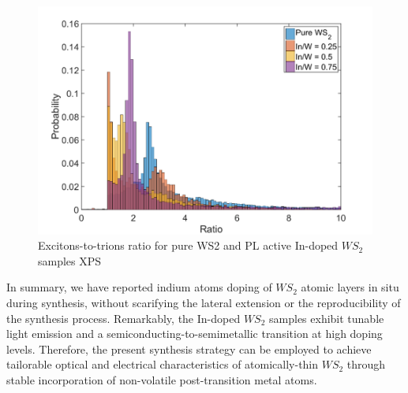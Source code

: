 \begin{figure}[!h]
	\begin{center}
		\includegraphics[scale=0.5]{In/PLRatioHistogram.png}
		\caption{Excitons-to-trions ratio for pure WS2 and PL active In-doped $WS_2$ samples XPS}
		\label{fig:InPLRatioHistogram}
	\end{center}
\end{figure}

In summary, we have reported indium atoms doping of $WS_2$ atomic layers in situ during synthesis, without scarifying the lateral extension or the reproducibility of the synthesis process. Remarkably, the In-doped $WS_2$ samples exhibit tunable light emission and a semiconducting-to-semimetallic transition at high doping levels. Therefore, the present synthesis strategy can be employed to achieve tailorable optical and electrical characteristics of atomically-thin $WS_2$ through stable incorporation of non-volatile post-transition metal atoms.
